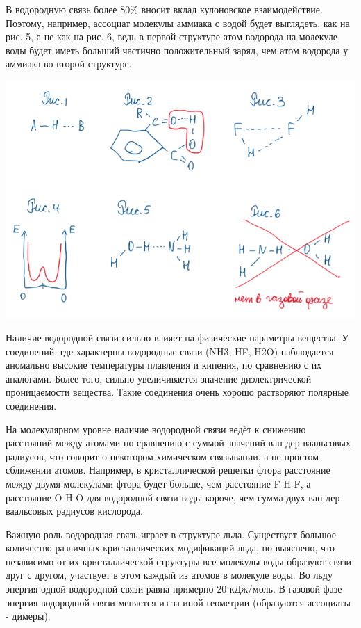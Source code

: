 В водородную связь более $80\%$ вносит вклад кулоновское взаимодействие. Поэтому, например, ассоциат молекулы аммиака с водой будет выглядеть, как на рис. 5, а не как на рис. 6,
ведь в первой структуре атом водорода на молекуле воды будет иметь больший частично положительный заряд, чем атом водорода у аммиака во второй структуре.

\includegraphics{images/17v1.png}

Наличие водородной связи сильно влияет на физические параметры вещества. У соединений, где характерны водородные связи (NH3, HF, H2O) наблюдается аномально высокие
температуры плавления и кипения, по сравнению с их аналогами. Более того, сильно увеличивается значение диэлектрической проницаемости вещества. Такие соединения очень
хорошо растворяют полярные соединения.

На молекулярном уровне наличие водородной связи ведёт к снижению расстояний между атомами по сравнению с суммой значений ван-дер-ваальсовых радиусов, что говорит о
некотором химическом связывании, а не простом сближении атомов. Например, в кристаллической решетки фтора расстояние между двумя молекулами фтора будет больше, чем
расстояние F-H-F, а расстояние O-H-O для водородной связи воды короче, чем сумма двух ван-дер-ваальсовых радиусов кислорода.

Важную роль водородная связь играет в структуре льда. Существует большое количество различных кристаллических модификаций льда, но выяснено, что независимо от их
кристаллической структуры все молекулы воды образуют связи друг с другом, участвует в этом каждый из атомов в молекуле воды. Во льду энергия одной водородной связи равна
примерно 20 кДж/моль. В газовой фазе энергия водородной связи меняется из-за иной геометрии (образуются ассоциаты - димеры).

